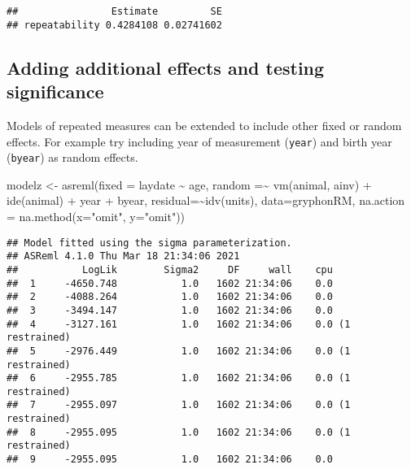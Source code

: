 \documentclass[
  12pt,
]{book}
\newenvironment{Shaded}{\begin{snugshade}}{\end{snugshade}}
\newcommand{\AttributeTok}[1]{\textcolor[rgb]{0.77,0.63,0.00}{#1}}
\newcommand{\FunctionTok}[1]{\textcolor[rgb]{0.00,0.00,0.00}{#1}}
\newcommand{\NormalTok}[1]{#1}
\newcommand{\OtherTok}[1]{\textcolor[rgb]{0.56,0.35,0.01}{#1}}
\newcommand{\SpecialCharTok}[1]{\textcolor[rgb]{0.00,0.00,0.00}{#1}}
\newcommand{\StringTok}[1]{\textcolor[rgb]{0.31,0.60,0.02}{#1}}
\begin{document}
\begin{verbatim}
##                Estimate         SE
## repeatability 0.4284108 0.02741602
\end{verbatim}

\hypertarget{adding-additional-effects-and-testing-significance}{%
\subsection{Adding additional effects and testing significance}\label{adding-additional-effects-and-testing-significance}}

Models of repeated measures can be extended to include other fixed or random effects. For example try including year of measurement (\texttt{year}) and birth year (\texttt{byear}) as random effects.

\begin{Shaded}
\begin{Highlighting}[]
\NormalTok{modelz }\OtherTok{\textless{}{-}} \FunctionTok{asreml}\NormalTok{(}\AttributeTok{fixed =}\NormalTok{ laydate }\SpecialCharTok{\textasciitilde{}}\NormalTok{ age,}
                 \AttributeTok{random =}\SpecialCharTok{\textasciitilde{}} \FunctionTok{vm}\NormalTok{(animal, ainv) }\SpecialCharTok{+} \FunctionTok{ide}\NormalTok{(animal) }\SpecialCharTok{+}
\NormalTok{                 year }\SpecialCharTok{+}\NormalTok{ byear,}
                 \AttributeTok{residual=}\SpecialCharTok{\textasciitilde{}}\FunctionTok{idv}\NormalTok{(units),}
                 \AttributeTok{data=}\NormalTok{gryphonRM,}
                 \AttributeTok{na.action =} \FunctionTok{na.method}\NormalTok{(}\AttributeTok{x=}\StringTok{"omit"}\NormalTok{, }\AttributeTok{y=}\StringTok{"omit"}\NormalTok{))}
\end{Highlighting}
\end{Shaded}

\begin{verbatim}
## Model fitted using the sigma parameterization.
## ASReml 4.1.0 Thu Mar 18 21:34:06 2021
##           LogLik        Sigma2     DF     wall    cpu
##  1     -4650.748           1.0   1602 21:34:06    0.0
##  2     -4088.264           1.0   1602 21:34:06    0.0
##  3     -3494.147           1.0   1602 21:34:06    0.0
##  4     -3127.161           1.0   1602 21:34:06    0.0 (1 restrained)
##  5     -2976.449           1.0   1602 21:34:06    0.0 (1 restrained)
##  6     -2955.785           1.0   1602 21:34:06    0.0 (1 restrained)
##  7     -2955.097           1.0   1602 21:34:06    0.0 (1 restrained)
##  8     -2955.095           1.0   1602 21:34:06    0.0 (1 restrained)
##  9     -2955.095           1.0   1602 21:34:06    0.0
\end{verbatim}
\end{document}
